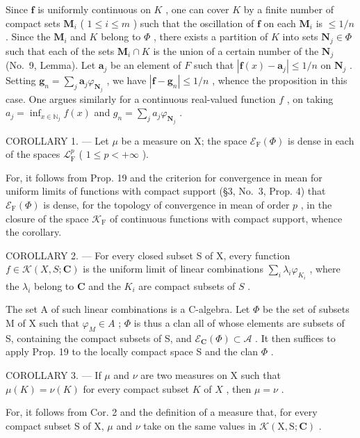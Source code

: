 Since \(\mathbf{f}\) is uniformly continuous on \(K\) , one can cover \(K\) by a finite number of compact sets \(\mathbf{M}_i\) ( \(1 \leqslant i \leqslant m\) ) such that the oscillation of \(\mathbf{f}\) on each \(\mathbf{M}_i\) is \(\leqslant 1/n\) . Since the \(\mathbf{M}_i\) and \(K\) belong to \(\Phi\) , there exists a partition of \(K\) into sets \(\mathbf{N}_j \in \Phi\) such that each of the sets \(\mathbf{M}_i \cap K\) is the union of a certain number of the \(\mathbf{N}_j\) (No.~9, Lemma). Let \(\mathbf{a}_j\) be an element of \(F\) such that \(|\mathbf{f}(x) - \mathbf{a}_j| \leqslant 1/n\) on \(\mathbf{N}_j\) . Setting \(\mathbf{g}_n = \sum_j \mathbf{a}_j \varphi_{\mathbf{N}_j}\) , we have \(|\mathbf{f} - \mathbf{g}_n| \leqslant 1/n\) , whence the proposition in this case. One argues similarly for a continuous real-valued function \(f\) , on taking \(a_j = \inf_{x \in \mathbb{N}_j} f(x)\) and \(g_n = \sum_j a_j \varphi_{\mathbf{N}_j}\) .

COROLLARY 1. --- Let \(\mu\) be a measure on X; the space \(\mathcal{E}_{\mathrm{F}}(\Phi)\) is dense in each of the spaces \(\mathcal{L}_{\mathrm{F}}^{p}\) ( \(1 \leqslant p < +\infty\) ).

For, it follows from Prop. 19 and the criterion for convergence in mean for uniform limits of functions with compact support (§3, No.~3, Prop. 4) that \(\mathcal{E}_{\mathrm{F}}(\Phi)\) is dense, for the topology of convergence in mean of order \(p\) , in the closure of the space \(\mathcal{K}_{\mathrm{F}}\) of continuous functions with compact support, whence the corollary.

COROLLARY 2. --- For every closed subset S of X, every function \(f \in \mathcal{K}(X, S; \mathbf{C})\) is the uniform limit of linear combinations \(\sum_{i} \lambda_i \varphi_{K_i}\) , where the \(\lambda_i\) belong to \(\mathbf{C}\) and the \(K_i\) are compact subsets of \(S\) .

The set A of such linear combinations is a C-algebra. Let \(\Phi\) be the set of subsets M of X such that \(\varphi_{M} \in A\) ; \(\Phi\) is thus a clan all of whose elements are subsets of S, containing the compact subsets of S, and \(\mathcal{E}_{\mathbf{C}}(\Phi) \subset \mathcal{A}\) . It then suffices to apply Prop. 19 to the locally compact space S and the clan \(\Phi\) .

COROLLARY 3. --- If \(\mu\) and \(\nu\) are two measures on X such that \(\mu(K) = \nu(K)\) for every compact subset \(K\) of \(X\) , then \(\mu = \nu\) .

For, it follows from Cor. 2 and the definition of a measure that, for every compact subset S of X, \(\mu\) and \(\nu\) take on the same values in \(\mathcal{K}(\mathrm{X},\mathrm{S};\mathbf{C})\) .


